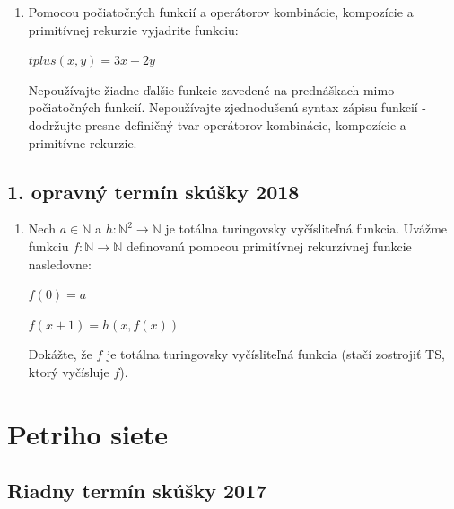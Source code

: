 \documentclass[11pt,a4paper]{article}
\begin{document}
		\begin{enumerate}
			\item Pomocou počiatočných funkcií a operátorov kombinácie, kompozície a primitívnej rekurzie vyjadrite funkciu:

			$tplus(x,y) = 3x + 2y$
	
			Nepoužívajte žiadne ďalšie funkcie zavedené na prednáškach mimo počiatočných funkcií. Nepoužívajte zjednodušenú syntax zápisu funkcií \-- dodržujte presne definičný tvar operátorov kombinácie, kompozície a primitívne rekurzie.
		\end{enumerate}	
	
		\subsection{1. opravný termín skúšky 2018}
		
		\begin{enumerate}
			\item Nech $a \in \mathbb{N}$ a $h: \mathbb{N}^2 \rightarrow \mathbb{N}$ je totálna turingovsky vyčísliteľná funkcia. Uvážme funkciu $f: \mathbb{N} \rightarrow \mathbb{N}$ definovanú pomocou primitívnej rekurzívnej funkcie nasledovne:
			
			$f(0) = a$
			
			$f(x+1) = h(x, f(x))$
			
			Dokážte, že $f$ je totálna turingovsky vyčísliteľná funkcia (stačí zostrojiť TS, ktorý vyčísluje $f$).
			
		\end{enumerate}	

	\section{Petriho siete}

		\subsection{Riadny termín skúšky 2017}
\end{document}
